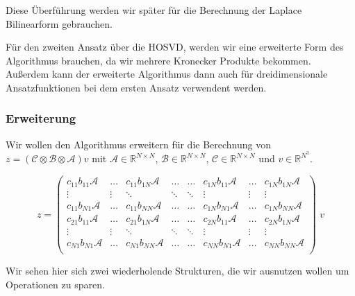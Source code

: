 Diese Überführung werden wir später für die Berechnung der Laplace Bilinearform gebrauchen.


Für den zweiten Ansatz über die HOSVD,  werden wir eine erweiterte Form des Algorithmus brauchen, da wir mehrere Kronecker Produkte bekommen. Außerdem kann der erweiterte Algorithmus dann auch für dreidimensionale Ansatzfunktionen bei dem ersten Ansatz verwendent werden.


\subsubsection{Erweiterung}
Wir wollen den Algorithmus erweitern für die Berechnung von $z=(\mathcal{C} \otimes \mathcal{B} \otimes \mathcal{A})v$ mit $\mathcal{A} \in \mathbb{R}^{N \times N}$, $\mathcal{B} \in \mathbb{R}^{N \times N}$, $\mathcal{C} \in \mathbb{R}^{N \times N}$ und $v \in \mathbb{R}^{N^3}$.


\begin{equation} z=
\begin{pmatrix}
c_{11} b_{11} \mathcal{A} & \dots  & c_{11} b_{1N} \mathcal{A} & \dots & \dots & c_{1N}b_{11}\mathcal{A} & \dots & c_{1N}b_{1N}\mathcal{A}  \\

\vdots & \vdots & \ddots & \ddots  & \ddots & \vdots & \vdots & \vdots \\
c_{11} b_{N 1} \mathcal{A} & \dots  & c_{11} b_{N N} \mathcal{A} & \dots & \dots & c_{1 N}b_{N 1}\mathcal{A} & \dots & c_{1 N}b_{N N}\mathcal{A}  \\
c_{21} b_{11} \mathcal{A} & \dots  & c_{21} b_{1N} \mathcal{A} & \dots & \dots & c_{2N}b_{11}\mathcal{A} & \dots & c_{2 N}b_{1 N}\mathcal{A}  \\
\vdots & \vdots & \ddots & \ddots  & \ddots & \vdots & \vdots & \vdots \\
c_{N 1} b_{N 1} \mathcal{A} & \dots  & c_{N 1} b_{N N} \mathcal{A} & \dots & \dots & c_{N N}b_{N 1}\mathcal{A} & \dots & c_{N N}b_{N N}\mathcal{A}  \\
\end{pmatrix} \, \, v
\end{equation}

Wir sehen hier sich zwei wiederholende Strukturen, die wir ausnutzen wollen um Operationen zu sparen.

